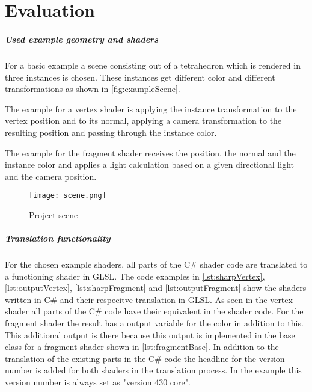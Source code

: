 
\chapter{Evaluation}\label{cha:Evaluation}

\paragraph{Used example geometry and shaders}

For a basic example a scene consisting out of a tetrahedron which is rendered in three instances is chosen. These instances get different color and different transformations as shown in  \autoref{fig:exampleScene}.

The example for a vertex shader is applying the instance transformation to the vertex position and to its normal, applying a camera transformation to the resulting position and passing through the instance color.

The example for the fragment shader receives the position, the normal and the instance color and applies a light calculation based on a given directional light and the camera position.

\begin{figure}[h!]
  \centering 
  \texttt{[image: scene.png]}
  \caption[Screenshot of example scene of the project]{Project scene}
  \label{fig:exampleScene}
\end{figure}

\paragraph{Translation functionality}

For the chosen example shaders, all parts of the C\# shader code are translated to a functioning shader in GLSL. The code examples in \autoref{lst:sharpVertex},\autoref{lst:outputVertex}, \autoref{lst:sharpFragment} and \autoref{lst:outputFragment} show the shaders written in C\# and their respecitve translation in GLSL. As seen in the vertex shader all parts of the C\# code have their equivalent in the shader code. For the fragment shader the result has a output variable for the color in addition to this. This additional output is there because this output is implemented in the base class for a fragment shader shown in \autoref{lst:fragmentBase}. In addition to the translation of the existing parts in the C\# code the headline for the version number is added for both shaders in the translation process. In the example this version number is always set as "version 430 core".

